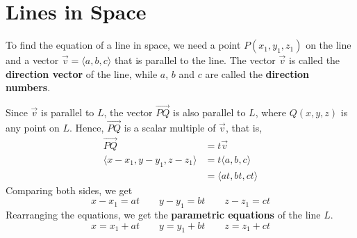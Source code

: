 \chapter{Lines in Space}

\begin{center}
\end{center}

To find the equation of a line in space, we need a point $P(x_1, y_1, z_1)$ on
the line and a vector $\vec{v} = \langle a, b, c \rangle$ that is parallel to
the line. The vector $\vec{v}$ is called the \textbf{direction vector} of the
line, while $a$, $b$ and $c$ are called the \textbf{direction numbers}.

Since $\vec{v}$ is parallel to $L$, the vector $\overrightarrow{PQ}$ is also
parallel to $L$, where $Q(x, y, z)$ is any point on $L$. Hence,
$\overrightarrow{PQ}$ is a scalar multiple of $\vec{v}$, that is,
\begin{align*}
    \overrightarrow{PQ}                       & = t\vec{v}                   \\
    \langle x - x_1, y - y_1, z - z_1 \rangle & = t\langle a, b, c \rangle   \\
                                              & = \langle at, bt, ct \rangle
\end{align*}
Comparing both sides, we get \[x - x_1 = at \qquad y - y_1 = bt \qquad z - z_1 = ct\]
Rearranging the equations, we get the \textbf{parametric equations} of the line
$L$. \[x = x_1 + at \qquad y = y_1 + bt \qquad z = z_1 + ct\]

